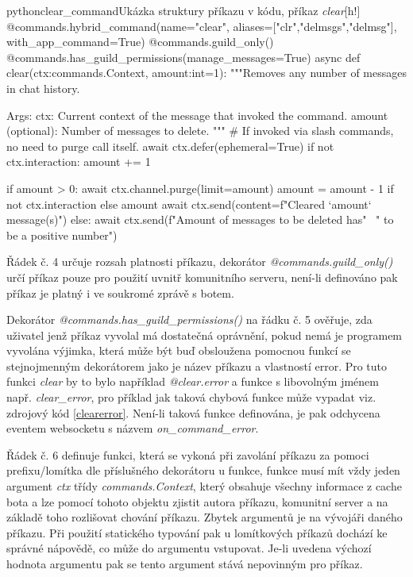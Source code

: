 \documentclass[
  program=inf,
biblatex=false,
sourcecodes=true,
joinlists=true,
  figures=true,
  tables=true,
  glossaries=true,
  index=false
]{kidiplom}
\begin{document}
\begin{kicode}{python}{clear_command}{Ukázka struktury příkazu v kódu, příkaz {\it clear}}[h!]
  @commands.hybrid_command(name="clear",
    aliases=["clr","delmsgs","delmsg"],
    with_app_command=True)
  @commands.guild_only()
  @commands.has_guild_permissions(manage_messages=True)
  async def clear(ctx:commands.Context, amount:int=1):
    """Removes any number of messages in chat history.

    Args:
        ctx: Current context of the message that invoked the command.
        amount (optional): Number of messages to delete.
    """
    # If invoked via slash commands, no need to purge call itself.
    await ctx.defer(ephemeral=True)    
    if not ctx.interaction:
      amount += 1

    if amount > 0:
      await ctx.channel.purge(limit=amount)
      amount = amount - 1 if not ctx.interaction else amount
      await ctx.send(content=f"Cleared `{amount}` message(s)")
    else:
      await ctx.send(f"Amount of messages to be deleted has" \
                      " to be a positive number")
\end{kicode}

Řádek č. 4 určuje rozsah platnosti příkazu, dekorátor {\it @commands.guild\_only()} určí příkaz
pouze pro použití uvnitř komunitního serveru, není-li definováno pak příkaz je platný i ve soukromé zprávě
s botem.

Dekorátor {\it @commands.has\_guild\_permissions()} na řádku č. 5 ověřuje, zda uživatel
jenž příkaz vyvolal má dostatečná oprávnění, pokud nemá je programem vyvolána výjimka, která může být buď
obsloužena pomocnou funkcí se stejnojmenným dekorátorem jako je název příkazu a vlastností error. Pro
tuto funkci {\it clear} by to bylo například {\it @clear.error} a funkce s libovolným jménem např. {\it clear\_error}, pro
příklad jak taková chybová funkce může vypadat viz. zdrojový kód \ref{clearerror}. Není-li taková funkce definována, je pak odchycena
eventem websocketu s názvem {\it on\_command\_error}.

Řádek č. 6 definuje funkci, která se vykoná při zavolání příkazu za pomoci prefixu/lomítka dle příslušného
dekorátoru u funkce, funkce musí mít vždy jeden argument {\it ctx} třídy {\it commands.Context}, který 
obsahuje všechny informace z cache bota a lze pomocí tohoto objektu zjistit autora příkazu, komunitní server
a na základě toho rozlišovat chování příkazu. Zbytek argumentů je na vývojáři daného příkazu. Při použití 
statického typování pak u lomítkových příkazů dochází ke správné nápovědě, co může do argumentu vstupovat. Je-li uvedena výchozí hodnota argumentu
pak se tento argument stává nepovinným pro příkaz.
\end{document}
